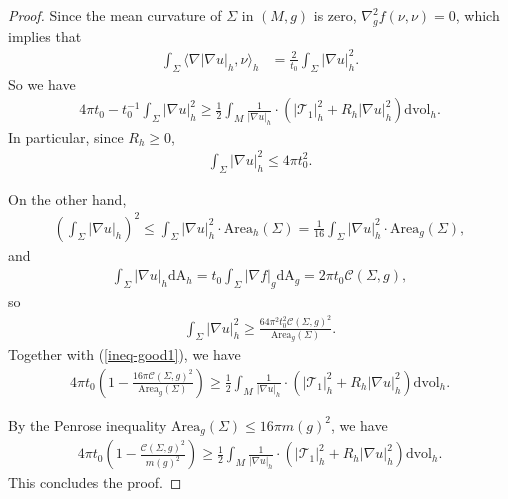 \documentclass[letter]{amsart}
\theoremstyle{definition}
\theoremstyle{remark}
\begin{document}
\begin{proof}
Since the mean curvature of $\Sigma $ in $(M,g)$ is zero, $\nabla ^2_g f (\nu ,\nu ) =0$, which implies that
\begin{align*}
	\int_{\Sigma } \langle \nabla |\nabla u|_h, \nu \rangle_h &= \frac{2}{t_0} \int_{\Sigma } |\nabla u|_h^2.
\end{align*}
So we have 
\begin{align}\label{ineq-good1}
	4 \pi t_0 - t_0^{-1} \int_{\Sigma } |\nabla u|_h^2 \geq \frac{1}{2} \int_{M} \frac{1}{|\nabla u|_h} \cdot \left( |\mathcal{T}_1|_h^2 + R_h |\nabla u|_h^2 \right) \mathrm{dvol}_h.
\end{align}
In particular, since $R_h \geq 0$,
\begin{align}\label{L2-upper-boundary}
	\int_{\Sigma }|\nabla u|_h^2 \leq 4 \pi t_0^2.
\end{align}

On the other hand, 
\begin{align*}
	\left( \int_{\Sigma } |\nabla u|_h \right) ^2 \leq \int_{\Sigma } |\nabla u|_h^2 \cdot \mathrm{Area}_h(\Sigma ) = \frac{1}{16}\int_{\Sigma } |\nabla u|_h^2 \cdot \mathrm{Area}_g(\Sigma ),
\end{align*}
and
\begin{align*}
	\int_{\Sigma } |\nabla u|_h \mathrm{d A}_h = t_0 \int_{\Sigma } |\nabla f|_g \mathrm{d A}_g = 2 \pi t_0 \mathcal{C}(\Sigma ,g),
\end{align*}
so
\begin{align*}
	\int_{\Sigma } |\nabla u|_h^2 \geq \frac{64 \pi ^2 t_0^2 \mathcal{C}(\Sigma ,g)^2}{\mathrm{Area}_g(\Sigma )}.
\end{align*}
Together with (\ref{ineq-good1}), we have
\begin{align}\label{area-cap-ineq}
	4 \pi t_0 \left( 1- \frac{16 \pi \mathcal{C}(\Sigma , g)^2}{\mathrm{Area}_g (\Sigma )} \right) \geq \frac{1}{2} \int_{M} \frac{1}{|\nabla u|_h} \cdot \left( |\mathcal{T}_1|_h^2 + R_h |\nabla u|_h^2 \right) \mathrm{dvol}_h.
\end{align}

By the Penrose inequality $\mathrm{Area}_g(\Sigma ) \leq 16 \pi m(g)^2$, we have
\begin{align*}
	4 \pi t_0 \left( 1- \frac{\mathcal{C}(\Sigma ,g)^2}{m(g)^2} \right) \geq \frac{1}{2} \int_{M} \frac{1}{|\nabla u|_h} \cdot \left( |\mathcal{T}_1|_h^2 + R_h |\nabla u|_h^2 \right) \mathrm{dvol}_h.
\end{align*}
This concludes the proof. 

\end{proof}
\end{document}
